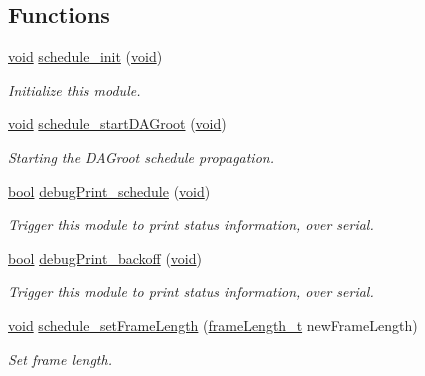 \subsection*{Functions}
\begin{DoxyCompactItemize}
\item 
\hyperlink{usb__devapi_8h_afabf60e7f57651d6d595a02c75f07cd0}{void} \hyperlink{group___schedule_ga7297bbaa78e266834d3027fbe33688a2}{schedule\+\_\+init} (\hyperlink{usb__devapi_8h_afabf60e7f57651d6d595a02c75f07cd0}{void})
\begin{DoxyCompactList}\small\item\em Initialize this module. \end{DoxyCompactList}\item 
\hyperlink{usb__devapi_8h_afabf60e7f57651d6d595a02c75f07cd0}{void} \hyperlink{group___schedule_gade694f312044f8bff151d58c7976d067}{schedule\+\_\+start\+D\+A\+Groot} (\hyperlink{usb__devapi_8h_afabf60e7f57651d6d595a02c75f07cd0}{void})
\begin{DoxyCompactList}\small\item\em Starting the D\+A\+Groot schedule propagation. \end{DoxyCompactList}\item 
\hyperlink{_p_e___types_8h_a97a80ca1602ebf2303258971a2c938e2}{bool} \hyperlink{group___schedule_gafbaaa0f57ce9c382c0fc00225a7b2078}{debug\+Print\+\_\+schedule} (\hyperlink{usb__devapi_8h_afabf60e7f57651d6d595a02c75f07cd0}{void})
\begin{DoxyCompactList}\small\item\em Trigger this module to print status information, over serial. \end{DoxyCompactList}\item 
\hyperlink{_p_e___types_8h_a97a80ca1602ebf2303258971a2c938e2}{bool} \hyperlink{group___schedule_gac7367d23ea854c9f421dd0a18d767fd1}{debug\+Print\+\_\+backoff} (\hyperlink{usb__devapi_8h_afabf60e7f57651d6d595a02c75f07cd0}{void})
\begin{DoxyCompactList}\small\item\em Trigger this module to print status information, over serial. \end{DoxyCompactList}\item 
\hyperlink{usb__devapi_8h_afabf60e7f57651d6d595a02c75f07cd0}{void} \hyperlink{group___schedule_ga5b2f9c520f24d642064f63558ee6cb45}{schedule\+\_\+set\+Frame\+Length} (\hyperlink{group___schedule_gab960413860c0b01b38ece025b0ee534d}{frame\+Length\+\_\+t} new\+Frame\+Length)
\begin{DoxyCompactList}\small\item\em Set frame length. \end{DoxyCompactList}\item 

\end{DoxyCompactItemize}
